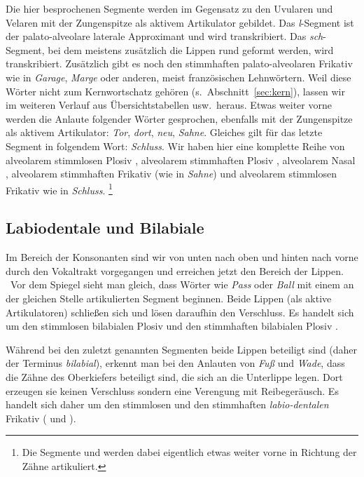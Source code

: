Die hier besprochenen Segmente werden im Gegensatz zu den Uvularen und Velaren mit der Zungenspitze als aktivem Artikulator gebildet.
Das \textit{l}-Segment ist der palato-alveolare laterale Approximant und wird \textipa{[l]} transkribiert.
Das \textit{sch}-Segment, bei dem meistens zusätzlich die Lippen rund geformt werden, wird \textipa{[S]} transkribiert.
Zusätzlich gibt es noch den stimmhaften palato-alveolaren Frikativ \textipa{[Z]} wie in \textit{Garage}, \textit{Marge} oder anderen, meist französischen Lehnwörtern.
Weil diese Wörter nicht zum Kernwortschatz gehören (s.\ Abschnitt~\ref{sec:kern}), lassen wir \textipa{[Z]} im weiteren Verlauf aus Übersichtstabellen usw.\ heraus.
Etwas weiter vorne werden die Anlaute folgender Wörter gesprochen, ebenfalls mit der Zungenspitze als aktivem Artikulator: \textit{Tor}, \textit{dort}, \textit{neu}, \textit{Sahne}.
Gleiches gilt für das letzte Segment in folgendem Wort: \textit{Schluss}.
Wir haben hier eine komplette Reihe von alveolarem stimmlosen Plosiv \textipa{[t]}, alveolarem stimmhaften Plosiv \textipa{[d]}, alveolarem Nasal \textipa{[n]}, alveolarem stimmhaften Frikativ \textipa{[z]} (wie in \textit{Sahne}) und alveolarem stimmlosen Frikativ \textipa{[s]} wie in \textit{Schluss}.%
\footnote{Die Segmente \textipa{[s]} und \textipa{[z]} werden dabei eigentlich etwas weiter vorne in Richtung der Zähne artikuliert.}

\subsection{Labiodentale und Bilabiale}


Im Bereich der Konsonanten sind wir von unten nach oben und hinten nach vorne durch den Vokaltrakt vorgegangen und erreichen jetzt den Bereich der Lippen.
\TuBegin~Vor dem Spiegel sieht man gleich, dass Wörter wie \textit{Pass} oder \textit{Ball} mit einem an der gleichen Stelle artikulierten Segment beginnen.
Beide Lippen (als aktive Artikulatoren) schließen sich und lösen daraufhin den Verschluss.
Es handelt sich um den stimmlosen bilabialen Plosiv \textipa{[p]} und den stimmhaften bilabialen Plosiv \textipa{[b]}.

Während bei den zuletzt genannten Segmenten beide Lippen beteiligt sind (daher der Terminus \textit{bilabial}), erkennt man bei den Anlauten von \textit{Fuß} und \textit{Wade}, dass die Zähne des Oberkiefers beteiligt sind, die sich an die Unterlippe legen.
Dort erzeugen sie keinen Verschluss sondern eine Verengung mit Reibegeräusch.
Es handelt sich daher um den stimmlosen und den stimmhaften \textit{labio-dentalen} Frikativ (\textipa{[f]} und \textipa{[v]}).

